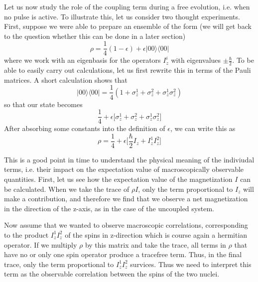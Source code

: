 \documentclass[a4paper, draft]{article}
\theoremstyle{own}
\theoremstyle{remark}
\begin{document}
Let us now study the role of the coupling term during a free evolution, i.e. when no pulse is active. To illustrate this, let us consider two thought experiments. First, suppose we were able to prepare an ensemble of the form (we will get back to the question whether this can be done in a later section)
$$
\rho = \frac{1}{4} (1 - \epsilon) + \epsilon |00 \rangle \langle 00 |
$$
where we work with an eigenbasis for the operators $I_z^i$ with eigenvalues $\pm \frac{\hbar}{2}$.  
To be able to easily carry out calculations, let us first rewrite this in terms of the Pauli matrices. A short calculation shows that
$$
|00 \rangle \langle 00 | = \frac{1}{4} (1 + \sigma_z^1 + \sigma_z^2 +  \sigma_z^1 \sigma_z^2)
$$
so that our state becomes
$$
\frac{1}{4} + \epsilon \big[ \sigma_z^1 + \sigma_z^2 + \sigma_z^1 \sigma_z^2 \big] 
$$
After absorbing some constants into the definition of $\epsilon$, we can write this as
$$
\rho = \frac{1}{4} + \epsilon \big[  \frac{\hbar}{2} I_z + I_z^1 I_z^2    \big]
$$

This is a good point in time to understand the physical meaning of the indiviudal terms, i.e. their impact on the expectation value of macroscopically observable quantities. First, let us see how the expectation value of the magnetization $I$ can be calculated. When we take the trace of $\rho I$, only the term proportional to $I_z$ will make a contribution, and therefore we find that we observe a net magnetization in the direction of the z-axis, as in the case of the uncoupled system. 

Now assume that we wanted to observe macroscopic correlations, corresponding to the product $I_z^1 I_z^2$ of the spins in z-direction which is course again a hermitian operator. If we multiply $\rho$ by this matrix and take the trace, all terms in $\rho$ that have no or only one spin operator produce a tracefree term. Thus, in the final trace, only the term proportional to $I_z^1 I_z^2$ survices. Thus we need to interpret this term as the observable correlation between the spins of the two nuclei. 
\end{document}
